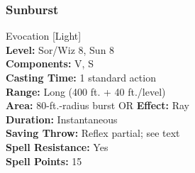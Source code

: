 % 
% 
% 


\subsubsection{Sunburst}
\label{Spell:Sunburst}
Evocation [Light]
\\ \textbf{Level:} Sor/Wiz 8, Sun 8
\\ \textbf{Components:} V, S
\\ \textbf{Casting Time:} 1 standard action
\\ \textbf{Range:} Long (400 ft. + 40 ft./level)
\\ \textbf{Area:} 80-ft.-radius burst OR \textbf{Effect:} Ray
\\ \textbf{Duration:} Instantaneous
\\ \textbf{Saving Throw:} Reflex partial; see text
\\ \textbf{Spell Resistance:} Yes
\\ \textbf{Spell Points:} 15

